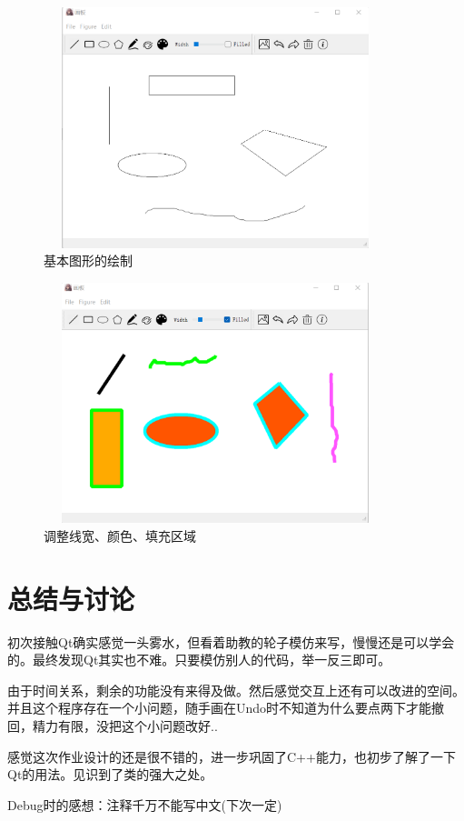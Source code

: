 \documentclass{article}
\begin{document}
		\begin{figure}[H]
		\begin{center}
			
			\includegraphics[width=10cm,height=7cm]{1}
			\caption{基本图形的绘制} 
		\end{center}
	\end{figure}

    	\begin{figure}[H]
    	\begin{center}
    		
    		\includegraphics[width=10cm,height=7cm]{2}
    		\caption{调整线宽、颜色、填充区域} 
    	\end{center}
    \end{figure}
	
	
	
	
	
	\section{总结与讨论}
	
	初次接触Qt确实感觉一头雾水，但看着助教的轮子模仿来写，慢慢还是可以学会的。最终发现Qt其实也不难。只要模仿别人的代码，举一反三即可。
	
	由于时间关系，剩余的功能没有来得及做。然后感觉交互上还有可以改进的空间。并且这个程序存在一个小问题，随手画在Undo时不知道为什么要点两下才能撤回，精力有限，没把这个小问题改好..
	
	
	感觉这次作业设计的还是很不错的，进一步巩固了C++能力，也初步了解了一下Qt的用法。见识到了类的强大之处。
	
	Debug时的感想：注释千万不能写中文(下次一定)
	

	
	

	
\end{document}

